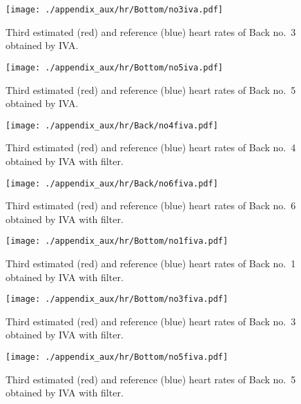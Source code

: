 \begin{figure}[tb]
\centering
\texttt{[image: ./appendix\_aux/hr/Bottom/no3iva.pdf]}
  \caption{Third estimated (red) and reference (blue) heart rates of Back no.~3 obtained by IVA.}
\end{figure}

\begin{figure}[tb]
\centering
\texttt{[image: ./appendix\_aux/hr/Bottom/no5iva.pdf]}
  \caption{Third estimated (red) and reference (blue) heart rates of Back no.~5 obtained by IVA.}
\end{figure}

\begin{figure}[tb]
\centering
\texttt{[image: ./appendix\_aux/hr/Back/no4fiva.pdf]}
  \caption{Third estimated (red) and reference (blue) heart rates of Back no.~4 obtained by IVA with filter.}
\end{figure}

\begin{figure}[tb]
\centering
\texttt{[image: ./appendix\_aux/hr/Back/no6fiva.pdf]}
  \caption{Third estimated (red) and reference (blue) heart rates of Back no.~6 obtained by IVA with filter.}
\end{figure}

\begin{figure}[tb]
\centering
\texttt{[image: ./appendix\_aux/hr/Bottom/no1fiva.pdf]}
  \caption{Third estimated (red) and reference (blue) heart rates of Back no.~1 obtained by IVA with filter.}
\end{figure}

\begin{figure}[tb]
\centering
\texttt{[image: ./appendix\_aux/hr/Bottom/no3fiva.pdf]}
  \caption{Third estimated (red) and reference (blue) heart rates of Back no.~3 obtained by IVA with filter.}
\end{figure}

\begin{figure}[tb]
\centering
\texttt{[image: ./appendix\_aux/hr/Bottom/no5fiva.pdf]}
  \caption{Third estimated (red) and reference (blue) heart rates of Back no.~5 obtained by IVA with filter.}
\end{figure}

